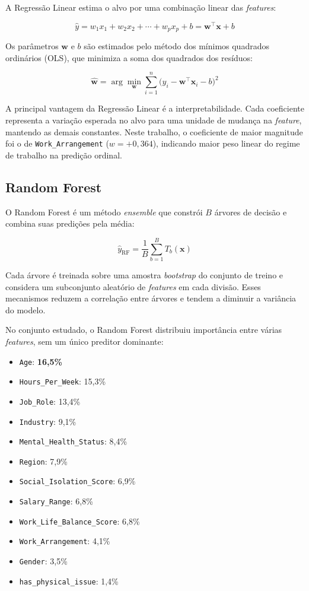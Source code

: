 \documentclass[conference]{IEEEtran}
\begin{document}
A Regressão Linear estima o alvo por uma combinação linear das
\textit{features}:

\begin{equation}
\hat{y} = w_1 x_1 + w_2 x_2 + \cdots + w_p x_p + b
= \mathbf{w}^{\top}\mathbf{x} + b
\end{equation}

Os parâmetros $\mathbf{w}$ e $b$ são estimados pelo método dos mínimos
quadrados ordinários (OLS), que minimiza a soma dos quadrados dos resíduos:

\begin{equation}
\hat{\mathbf{w}} = \arg\min_{\mathbf{w}}
\sum_{i=1}^{n} \bigl(y_i - \mathbf{w}^{\top}\mathbf{x}_i - b\bigr)^2
\end{equation}

A principal vantagem da Regressão Linear é a interpretabilidade. Cada
coeficiente representa a variação esperada no alvo para uma unidade de
mudança na \textit{feature}, mantendo as demais constantes. Neste trabalho,
o coeficiente de maior magnitude foi o de \texttt{Work_Arrangement}
($w=+0{,}364$), indicando maior peso linear do regime de trabalho na
predição ordinal.

\subsection{Random Forest}

O Random Forest \cite{breiman2001} é um método \textit{ensemble} que
constrói $B$ árvores de decisão e combina suas predições pela média:

\begin{equation}
\hat{y}_{\text{RF}} = \frac{1}{B} \sum_{b=1}^{B} T_b(\mathbf{x})
\end{equation}

Cada árvore é treinada sobre uma amostra \textit{bootstrap} do conjunto de
treino e considera um subconjunto aleatório de \textit{features} em cada
divisão. Esses mecanismos reduzem a correlação entre árvores e tendem a
diminuir a variância do modelo.

No conjunto estudado, o Random Forest distribuiu importância entre várias
\textit{features}, sem um único preditor dominante:

\begin{itemize}
\item \texttt{Age}: \textbf{16,5\%}
\item \texttt{Hours_Per_Week}: 15,3\%
\item \texttt{Job_Role}: 13,4\%
\item \texttt{Industry}: 9,1\%
\item \texttt{Mental_Health_Status}: 8,4\%
\item \texttt{Region}: 7,9\%
\item \texttt{Social_Isolation_Score}: 6,9\%
\item \texttt{Salary_Range}: 6,8\%
\item \texttt{Work_Life_Balance_Score}: 6,8\%
\item \texttt{Work_Arrangement}: 4,1\%
\item \texttt{Gender}: 3,5\%
\item \texttt{has_physical_issue}: 1,4\%
\end{itemize}
\end{document}
